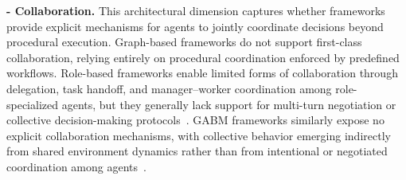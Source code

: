 \smallskip
\noindent\textbf{- Collaboration.}
This architectural dimension captures whether frameworks provide explicit mechanisms for agents to jointly coordinate decisions beyond procedural execution. Graph-based frameworks do not support first-class collaboration, relying entirely on procedural coordination enforced by predefined workflows. Role-based frameworks enable limited forms of collaboration through delegation, task handoff, and manager--worker coordination among role-specialized agents, but they generally lack support for multi-turn negotiation or collective decision-making protocols~\cite{crewai2025,wu2024autogen,openaiagents2025}. GABM frameworks similarly expose no explicit collaboration mechanisms, with collective behavior emerging indirectly from shared environment dynamics rather than from intentional or negotiated coordination among agents~\cite{vezhnevets2023generative,coordinationcollaborativereasoning}.








